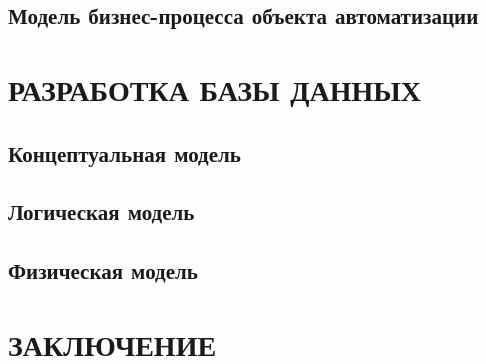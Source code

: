 \documentclass[12pt, a4paper, simple]{eskdtext}
\begin{document}
    \newpage
    
    \subsection{Модель бизнес-процесса объекта автоматизации}
    \newpage

    \section{РАЗРАБОТКА БАЗЫ ДАННЫХ}
    \subsection{Концептуальная модель}
    \subsection{Логическая модель}
    \subsection{Физическая модель}
    \newpage

    \newpage
    \section*{ЗАКЛЮЧЕНИЕ}
    \newpage

    \newpage
\end{document}
